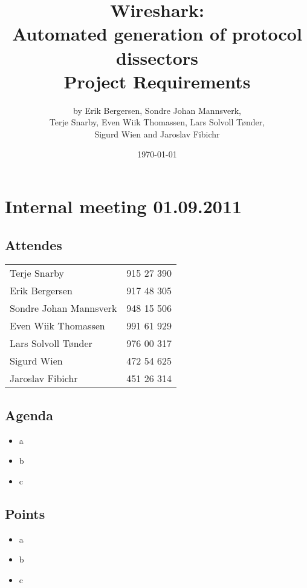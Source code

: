 \documentclass[a4paper, 11pt]{report}
\title{Wireshark:\\ Automated generation of protocol dissectors\\
		Project Requirements}
\author{by Erik Bergersen, Sondre Johan Mannsverk,\\ Terje Snarby,
		Even Wiik Thomassen, Lars Solvoll Tønder,\\ Sigurd Wien
		and Jaroslav Fibichr}
\date{\today}
\begin{document}
\section*{Internal meeting 01.09.2011}

\subsection*{Attendes}

\begin{tabular}{ l  l}
Terje Snarby & 915 27 390 \\
Erik Bergersen & 917 48 305 \\
Sondre Johan Mannsverk & 948 15 506 \\
Even Wiik Thomassen & 991 61 929 \\
Lars Solvoll Tønder & 976 00 317 \\
Sigurd Wien & 472 54 625 \\
Jaroslav Fibichr & 451 26 314 \\

\end{tabular}



\subsection*{Agenda}

\begin{itemize}
\item a
\item b
\item c
\end{itemize}

\subsection*{Points}

\begin{itemize}
\item a
\item b
\item c
\end{itemize}
\end{document}
